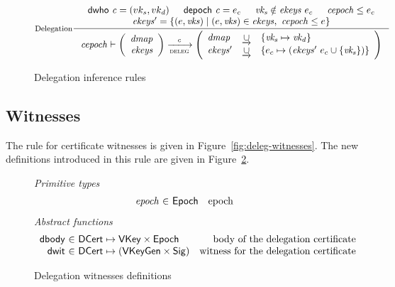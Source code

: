 \begin{figure}
  \begin{equation}\label{eq:delegation}
    \inference[Delegation]
    {\dwho{c} = (vk_s, vk_d) & \depoch{c} = e_c & \var{vk_s} \notin \var{ekeys}~e_c & \var{cepoch} \leq e_c\\
      \var{ekeys'} = \{ (e, \var{vks})  \mid (e, \var{vks}) \in \var{ekeys},~  \var{cepoch} \leq e \}
    }
    {
      \var{cepoch} \vdash
      \left(
      \begin{array}{r}
        \var{dmap}\\
        \var{ekeys}
      \end{array}
      \right)
      \trans{deleg}{c}
      \left(
      \begin{array}{lcl}
        \var{dmap} & \unionoverride & \{\var{vk_s} \mapsto \var{vk_d}\}\\
        \var{ekeys'} & \unionoverride & \{e_c \mapsto (\var{ekeys'}~e_c \cup \{\var{vk_s}\})\}
      \end{array}
      \right)
    }
  \end{equation}
  \caption{Delegation inference rules}
  \label{fig:state-trans-delegation}
\end{figure}

\subsection{Witnesses}
\label{sec:delegation-witnesses}

The rule for certificate witnesses is given in
Figure~\ref{fig:deleg-witnesses}. The new definitions introduced in this rule
are given in Figure~\ref{fig:delegation-witnesses-defs}.

\begin{figure}
  \emph{Primitive types}
  \begin{equation*}
    \begin{array}{r@{~\in~}lr}
      \var{epoch} & \Epoch & \text{epoch}
    \end{array}
  \end{equation*}
  \emph{Abstract functions}
  \begin{equation*}
    \begin{array}{r@{~\in~}lr}
      \fun{dbody} & \DCert \mapsto \VKey \times \Epoch
      & \text{body of the delegation certificate}\\
      \fun{dwit} & \DCert \mapsto (\VKeyGen \times \Sig)
      & \text{witness for the delegation certificate}
    \end{array}
  \end{equation*}
  \caption{Delegation witnesses definitions}
  \label{fig:delegation-witnesses-defs}
\end{figure}

